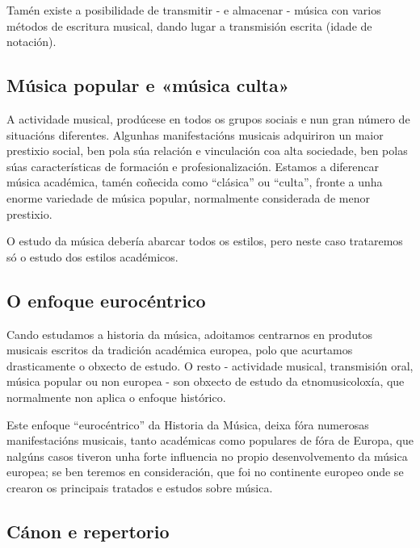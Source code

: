 \documentclass[a4paper, twoside]{templates/ociamthesis}
\theoremstyle{definition}
\theoremstyle{definition}
\theoremstyle{definition}
\theoremstyle{definition}
\theoremstyle{remark}
\begin{document}
Tamén existe a posibilidade de transmitir - e almacenar - música con varios métodos de escritura musical, dando lugar a transmisión escrita (idade de notación).

\hypertarget{muxfasica-popular-e-muxfasica-culta}{%
\subsection*{Música popular e «música culta»}\label{muxfasica-popular-e-muxfasica-culta}}

A actividade musical, prodúcese en todos os grupos sociais e nun gran número de situacións diferentes. Algunhas manifestacións musicais adquiriron un maior prestixio social, ben pola súa relación e vinculación coa alta sociedade, ben polas súas características de formación e profesionalización. Estamos a diferencar música académica, tamén coñecida como ``clásica'' ou ``culta'', fronte a unha enorme variedade de música popular, normalmente considerada de menor prestixio.

O estudo da música debería abarcar todos os estilos, pero neste caso trataremos só o estudo dos estilos académicos.

\hypertarget{o-enfoque-eurocuxe9ntrico}{%
\subsection*{O enfoque eurocéntrico}\label{o-enfoque-eurocuxe9ntrico}}

Cando estudamos a historia da música, adoitamos centrarnos en produtos musicais escritos da tradición académica europea, polo que acurtamos drasticamente o obxecto de estudo. O resto - actividade musical, transmisión oral, música popular ou non europea - son obxecto de estudo da etnomusicoloxía, que normalmente non aplica o enfoque histórico.

Este enfoque ``eurocéntrico'' da Historia da Música, deixa fóra numerosas manifestacións musicais, tanto académicas como populares de fóra de Europa, que nalgúns casos tiveron unha forte influencia no propio desenvolvemento da música europea; se ben teremos en consideración, que foi no continente europeo onde se crearon os principais tratados e estudos sobre música.

\hypertarget{cuxe1non-e-repertorio}{%
\subsection{Cánon e repertorio}\label{cuxe1non-e-repertorio}}
\end{document}

